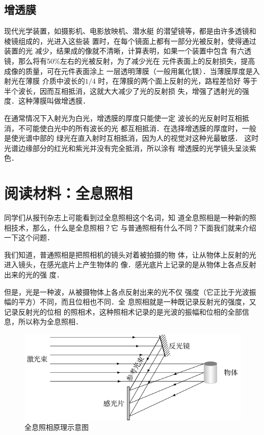 \subsection{增透膜}

现代光学装置，如摄影机、电影放映机、潜水艇
的潜望镜等，都是由许多透镜和棱镜组成的，光进入这些装
置时，在每个镜面上都有一部分光被反射，使得通过装置的光
减少，结果成的像就不清晰，计算表明，如果一个装置中包含
有六透镜，那么将有50\%左右的光被反射，为了减少光在
元件表面上的反射损失，提高成像的质量，可在元件表面涂上
一层透明薄膜（一般用氟化镁）．当薄膜厚度是入射光在薄膜
介质中波长的$1/4$
时，在薄膜的两个面上反射的光，路程差恰好
等于半个波长，因而互相抵消，这就大大减少了光的反射损
失，增强了透射光的强度．这种薄膜叫做增透膜．

在通常情况下入射光为白光，增透膜的厚度只能使一定
波长的光反射时互相抵消，不可能使白光中的所有波长的光
都互相抵消．在选择增透膜的厚度时，一般是使光谱中部的
绿光在直入射时互相抵消，因为人的视觉对这种光最敏感．
这时光谱边缘部分的红光和紫光并没有完全抵消，所以涂有
增透膜的光学镜头呈淡紫色．

\section*{阅读材料：全息照相}
同学们从报刊杂志上可能看到过全息照相这个名词，知
道全息照相是一种新的照相技术，那么，什么是全息照相？它
与普通照相有什么不同？下面我们就来介绍一下这个问题．

我们知道，普通照相是把照相机的镜头对着被拍摄的物
体，让从物体上反射的光进入镜头，在感光底片上产生物体的
像．感光底片上记录的是从物体上各点反射出来的光的强
度．

但是，光是一种波，从被摄物体上各点反射出来的光不仅
强度（它正比于光波振幅的平方）不同，而且位相也不同．全
息照相就是一种既记录反射光的强度，又记录反射光的位相
的照相术，这种照相术记录的是光波的振幅和位相的全部信
息，所以称为全息照相．
\begin{figure}[htbp]
    \centering
    \includegraphics{fig/C/6-6.pdf}
    \caption{全息照相原理示意图}\label{fig_C_6-6}
\end{figure}

